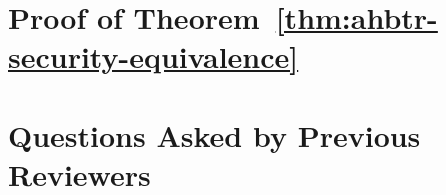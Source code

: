 \documentclass[
  layout=6x9,
  envelope-icons=no,
  format=lncs-submission
]{crypto-paper}
\begin{document}




\LaomianBody















\LaomianAcknowledgments


\LaomianAppendix

% 

\section{Proof of Theorem~\ref{thm:ahbtr-security-equivalence}}
\label{sec:deferred}



\section{Questions Asked by Previous Reviewers}
\label{sec:faq}


\end{document}
